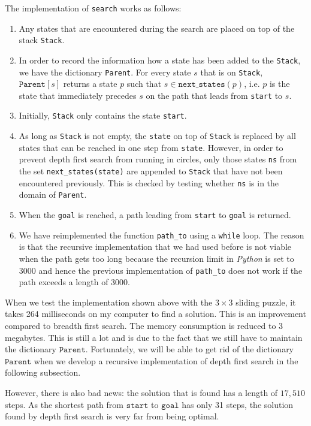 The implementation of  \texttt{search} works as follows:
\begin{enumerate}
\item Any states that are encountered during the search are placed on top of the stack \texttt{Stack}.
\item In order to record the information how a state has been added to the \texttt{Stack}, we have the dictionary
      \texttt{Parent}.  For every state $s$ that is on \texttt{Stack}, $\texttt{Parent}[s]$ returns a state $p$
      such that $s \in \texttt{next\_states}(p)$,  i.e. $p$ is the state that immediately precedes $s$ on the
      path that leads from \texttt{start} to $s$.  
\item Initially, \texttt{Stack} only contains the state \texttt{start}.
\item As long as \texttt{Stack} is not empty, the \texttt{state} on top of \texttt{Stack} is replaced by all
      states that can be reached in one step from \texttt{state}.  However, in order to prevent depth first search
      from running in circles, only those states \texttt{ns} from the set \texttt{next\_states(state)} are appended to
      \texttt{Stack} that have not been encountered previously.  This is checked by testing 
      whether \texttt{ns} is in the domain of \texttt{Parent}.
\item When the \texttt{goal} is reached,  a path leading from \texttt{start} to \texttt{goal} is returned.
\item We have reimplemented the function \texttt{path\_to} using a \texttt{while} loop.  The reason is that 
      the recursive implementation that we had used before is not viable when the path gets too long because
      the recursion limit in \textsl{Python} is set to 3000 and hence the previous implementation of
      \texttt{path\_to} does not work if the path exceeds a length of $3000$.
\end{enumerate}
When we test the implementation shown above with the $3 \times 3$ sliding puzzle, it takes 264 milliseconds 
on my computer to find a solution.  This is an improvement compared to breadth first search.
The memory consumption is reduced to 3 megabytes.  This is still a lot and is due to the fact that we still
have to maintain the dictionary $\texttt{Parent}$.  Fortunately, we will 
be able to get rid of the dictionary $\texttt{Parent}$ when we develop a recursive implementation of depth first
search in the following subsection. 

However, there is also bad news: the solution that is found has a length of $17,510$ steps.  As the
shortest path from $\texttt{start}$ to $\texttt{goal}$ has only 31 steps, the solution found by depth
first search is very far from being optimal.

